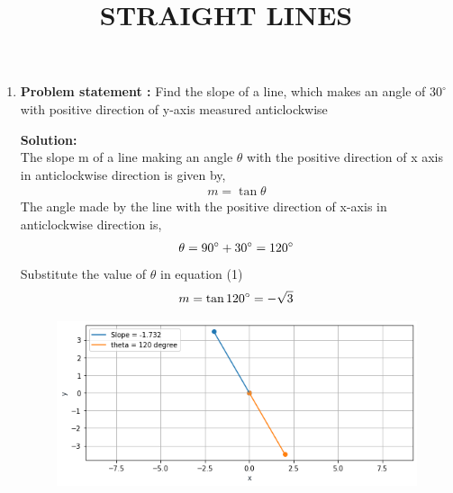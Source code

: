 \documentclass[12pt]{article}
\newcommand{\solution}{\noindent \textbf{Solution: }}
\begin{document}
\begin{center}
\title{\textbf{STRAIGHT LINES}}
\maketitle
\end{center}
\begin{enumerate}
\item\textbf{Problem statement :} Find the slope of a line, which makes an angle of $30^\circ$ with positive direction of y-axis measured anticlockwise

\solution
\\
The slope m of a line making an angle $\theta$ with the positive direction of x axis in anticlockwise direction is given by,
\begin{align}
    m=\tan\theta
\end{align}
The angle made by the line with the positive direction of x-axis in anticlockwise direction is,
\begin{align}
    \theta=90\degree + 30\degree=120\degree
\end{align}
Substitute the value of $\theta$ in equation (1)
\begin{align}
        m=\tan120\degree = -\sqrt{3}
\end{align}
\begin{figure}[!h]
 \begin{center}
  \includegraphics[width=\columnwidth]{figs/fig.png}
 \end{center}
\caption{}
\label{fig:Fig1}
\end{figure}
\end{enumerate}
\end{document}
